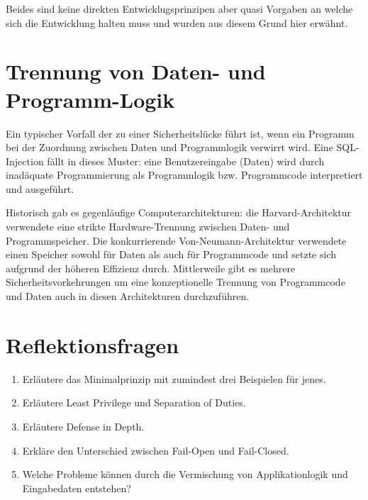 Beides sind keine direkten Entwicklugsprinzipen aber quasi Vorgaben an welche sich die Entwicklung halten muss und wurden aus diesem Grund hier erwähnt.

\section{Trennung von Daten- und Programm-Logik}

Ein typischer Vorfall der zu einer Sicherheitslücke führt ist, wenn ein Programm bei der Zuordnung zwischen Daten und Programmlogik verwirrt wird. Eine SQL-Injection fällt in dieses Muster: eine Benutzereingabe (Daten) wird durch inadäquate Programmierung als Programmlogik bzw. Programmcode interpretiert und ausgeführt.

Historisch gab es gegenläufige Computerarchitekturen: die Harvard-Architektur verwendete eine strikte Hardware-Trennung zwischen Daten- und Programmspeicher. Die konkurrierende Von-Neumann-Architektur verwendete einen Speicher sowohl für Daten als auch für Programmcode und setzte sich aufgrund der höheren Effizienz durch. Mittlerweile gibt es mehrere Sicherheitsvorkehrungen um eine konzeptionelle Trennung von Programmcode und Daten auch in diesen Architekturen durchzuführen.

\section{Reflektionsfragen}

\begin{enumerate}
	\item Erläutere das Minimalprinzip mit zumindest drei Beispielen für jenes.
	\item Erläutere Least Privilege und Separation of Duties.
	\item Erläutere Defense in Depth.
	\item Erkläre den Unterschied zwischen Fail-Open und Fail-Closed.
	\item Welche Probleme können durch die Vermischung von Applikationlogik und Eingabedaten entstehen?
\end{enumerate}
